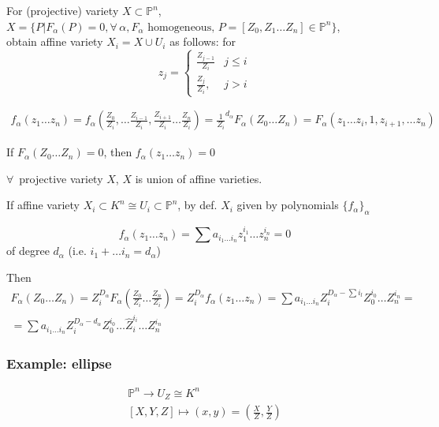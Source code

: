 For (projective) variety $X \subset \mathbb{P}^n$, $X = \lbrace P | F_{\alpha}(P) = 0, \forall \, \alpha, F_{\alpha} \text{ homogeneous, } P = [ Z_0 , Z_1 \dots Z_n] \in \mathbb{P}^n \rbrace$, \\
obtain affine variety $X_i = X \cup U_i$ as follows: for 
\[
z_j = \begin{cases} \frac{ Z_{j-1}}{ Z_i } & j \leq i \\ \frac{Z_j}{ Z_i} , & j > i \end{cases}
\]

\[
\begin{gathered}
f_{\alpha}(z_1 \dots z_n) = f_{\alpha}\left( \frac{Z_0}{Z_i} , \dots \frac{Z_{i-1}}{Z_i} , \frac{Z_{i+1}}{Z_i} \dots \frac{Z_n}{Z_i} \right) = \frac{1}{Z_i}^{d_{\alpha}} F_{\alpha}(Z_0 \dots Z_n) = F_{\alpha}(z_1 \dots z_i, 1, z_{i+1}, \dots z_n)
\end{gathered}
\]

If $F_{\alpha}(Z_0 \dots Z_n) = 0$, then $f_{\alpha}(z_1 \dots z_n) =0$

$\forall \, $ projective variety $X$, $X$ is union of affine varieties. 

If affine variety $X_i \subset K^n \cong U_i \subset \mathbb{P}^n$, by def. $X_i$ given by polynomials $\lbrace f_{\alpha} \rbrace_{\alpha}$

\[
f_{\alpha} (z_1 \dots z_n) = \sum a_{i_1 \dots i_n} z_1^{i_1} \dots z_n^{i_n} = 0
\]
of degree $d_{\alpha}$ (i.e. $i_1+ \dots i_n = d_{\alpha}$)

Then
\[
\begin{gathered}
F_{\alpha}(Z_0 \dots Z_n) = Z_i^{D_{\alpha}} F_{\alpha}\left( \frac{ Z_0}{Z_i} \dots \frac{Z_n}{Z_i} \right) = Z_i^{D_{\alpha}}f_{\alpha}(z_1 \dots z_n) = \sum a_{i_1 \dots i_n} Z_i^{D_{\alpha} - \sum i_l} Z_0^{i_0} \dots Z_n^{i_n} = \\
= \sum a_{i_1 \dots i_n} Z_i^{ D_{\alpha} - d_{\alpha}} Z_0^{i_0} \dots \widehat{Z}_i^{i_i} \dots Z_n^{i_n}
\end{gathered}\]

\subsubsection{Example: ellipse}

\begin{equation}
\begin{gathered}
\mathbb{P}^n \to U_Z \cong K^n \\
[X,Y,Z] \mapsto (x,y) = \left( \frac{X}{Z}, \frac{Y}{Z} \right) 
\end{gathered}
\end{equation}

